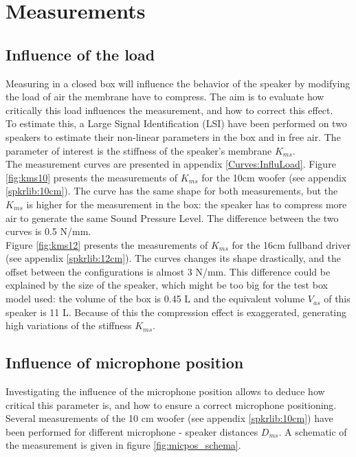 \documentclass{report}
\begin{document}
\section{Measurements}

\subsection{Influence of the load}

Measuring in a closed box will influence the behavior of the speaker by modifying the load of air the membrane have to compress. The aim is to evaluate how critically this load influences the measurement, and how to correct this effect. \\

To estimate this, a Large Signal Identification (LSI) have been performed on two speakers to estimate their non-linear parameters in the box and in free air. The parameter of interest is the stiffness of the speaker's membrane $K_{ms}$. \\
The measurement curves are presented in appendix \ref{Curves:InfluLoad}.
Figure \ref{fig:kms10} presents the measurements of $K_{ms}$ for the 10cm woofer (see appendix \ref{spkrlib:10cm}). The curve has the same shape for both measurements, but the $K_{ms}$ is higher for the measurement in the box: the speaker has to compress more air to generate the same Sound Pressure Level. The difference between the two curves is 0.5 N/mm. \\
Figure \ref{fig:kms12}  presents the measurements of $K_{ms}$ for the 16cm fullband driver (see appendix \ref{spkrlib:12cm}). The curves changes its shape drastically, and the offset between the configurations is almost 3 N/mm. This difference could be explained by the size of the speaker, which might be too big for the test box model used: the volume of the box is 0.45 L and the equivalent volume $V_{as}$ of this speaker is 11 L. Because of this the compression effect is exaggerated, generating high variations of the stiffness $K_{ms}$. \\



\subsection{Influence of microphone position}

Investigating the influence of the microphone position allows to deduce how critical this parameter is, and how to ensure a correct microphone positioning. Several measurements of the 10 cm woofer (see appendix \ref{spkrlib:10cm}) have been performed for different microphone - speaker distances $D_{ms}$. A schematic of the measurement is given in figure \ref{fig:micpos_schema}.  \\
\end{document}
